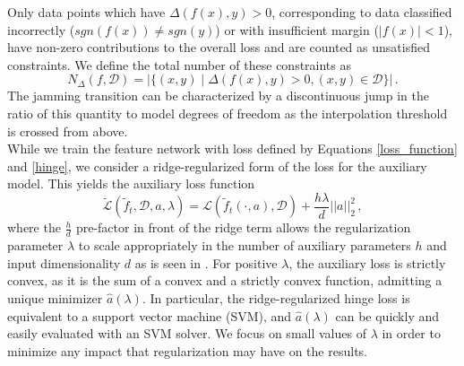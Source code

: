 \documentclass[11pt]{article}
\begin{document}
Only data points which have $\Delta(f(x), y) > 0$, corresponding to data classified incorrectly ($ sgn(f(x)) \neq sgn(y)$) or with insufficient margin ($|f(x)| < 1$), have non-zero contributions to the overall loss and are counted as unsatisfied constraints. We define the total number of these constraints as 
\begin{equation}
    N_\Delta(f, \mathcal D) = \left|\{(x, y) \mid \Delta(f(x), y) > 0, (x,y) \in \mathcal D\}\right|\,.
\end{equation}
The jamming transition can be characterized by a discontinuous jump in the ratio of this quantity to model degrees of freedom as the interpolation threshold is crossed from above. \\

While we train the feature network with loss defined by Equations \eqref{loss_function} and \eqref{hinge}, we consider a ridge-regularized form of the loss for the auxiliary model. This yields the auxiliary loss function
\begin{equation}
    \tilde{\mathcal{L}} (\tilde f_t, \mathcal D, a, \lambda) = \mathcal L (\tilde f_t(\cdot, a), \mathcal D) + \frac{h \lambda}{d} ||a||_2^2\,,
    \label{loss_reg}
\end{equation}
where the $\frac{h}{d}$ pre-factor in front of the ridge term allows the regularization parameter $\lambda$ to scale appropriately in the number of auxiliary parameters $h$ and input dimensionality $d$ as is seen in \cite{meiGeneralizationErrorRandom2019}. For positive $\lambda$, the auxiliary loss is strictly convex, as it is the sum of a convex and a strictly convex function, admitting a unique minimizer $\hat a(\lambda)$. In particular, the ridge-regularized hinge loss is equivalent to a support vector machine (SVM), and $\hat a(\lambda)$ can be quickly and easily evaluated with an SVM solver. We focus on small values of $\lambda$ in order to minimize any impact that regularization may have on the results.


\end{document}
